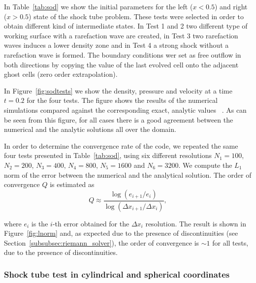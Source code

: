 In Table~\ref{tab:sod} we show the initial parameters for the left ($x < 0.5$) and right ($x > 0.5$) state of the shock tube problem. These tests were selected in order to obtain different kind of intermediate states. In Test 1 and 2 two different type of working surface with a rarefaction wave are created, in Test 3 two rarefaction waves induces a lower density zone and in Test 4 a strong shock without a rarefaction wave is formed. The boundary conditions wer set as free outflow in both directions by copying the value of the last evolved cell onto the adjacent ghost cells (zero order extrapolation).


In Figure~\ref{fig:sodtests} we show the density, pressure and velocity at a time $t=0.2$ for the four tests. The figure shows the results of the numerical simulations compared against the corresponding exact, analytic values~ \citep{toro2009}. As can be seen from this figure, for all cases there is a good agreement between the numerical and the analytic solutions all over the domain.

In order to determine the convergence rate of the code, we repeated the same four tests presented in Table~\ref{tab:sod}, using six different resolutions $N_1 = 100$, $N_2 = 200$, $N_3 = 400$, $N_4 = 800$, $N_5 = 1600$ and $N_6 = 3200$. We compute the $L_1$ norm of the error between the numerical and the analytical solution. The order of convergence $Q$ is estimated as 
\begin{equation}
Q \approx \frac{\log(e_{i+1}/e_i)}{\log(\Delta x_{i+1}/\Delta x_i)},
\end{equation}

\noindent where $e_i$ is the $i$-th error obtained for the $\Delta x_i$ resolution. The result is shown in Figure~\ref{fig:lnorm} and, as expected due to the presence of discontinuities (see Section~\ref{subsubsec:riemann_solver}), the order of convergence is $\sim 1$ for all tests, due to the presence of discontinuities.


\subsubsection{Shock tube test in cylindrical and spherical coordinates}
\label{subsubsec:sodcylsph}

